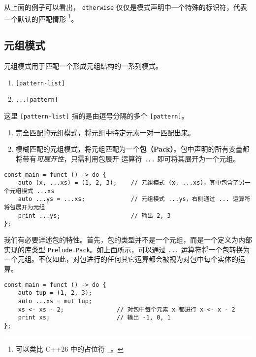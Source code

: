 从上面的例子可以看出， \lstinline!otherwise! 仅仅是模式声明中一个特殊的标识符，代表一个默认的匹配情形 \footnote{可以类比 C++26 中的占位符 \texttt{\_}。}。


\subsection{元组模式}

元组模式用于匹配一个形成元组结构的一系列模式。

\begin{grammar} \label{grm:tuple-pattern}
\begin{enumerate}
    \item \lstinline![pattern-list]!
    \item \lstinline!...[pattern]!
\end{enumerate}
\end{grammar}

这里 \lstinline![pattern-list]! 指的是由逗号分隔的多个 \lstinline![pattern]!。

\begin{enumerate}
    \item 完全匹配的元组模式，将元组中特定元素一对一匹配出来。
    \item 模糊匹配的元组模式，将元组匹配为一个\textbf{包（Pack）}。包中声明的所有变量都将带有\emph{可展开性}，只需利用包展开 运算符 \lstinline!...! 即可将其展开为一个元组。
\end{enumerate}

\begin{lstlisting}
const main = funct () -> do {
    auto (x, ...xs) = (1, 2, 3);    // 元组模式 (x, ...xs)，其中包含了另一个元组模式 ...xs
    auto ...ys = ...xs;             // 元组模式 ...ys，右侧通过 ... 运算符将包展开为元组
    print ...ys;                    // 输出 2, 3
};
\end{lstlisting}

我们有必要详述包的特性。首先，包的类型并不是一个元组，而是一个定义为内部实现的库类型 \lstinline!Prelude.Pack!。如上面所示，可以通过 \lstinline!...! 运算符将一个包转换为一个元组。不仅如此，对包进行的任何其它运算都会被视为对包中每个实体的运算。

\begin{lstlisting}
const main = funct () -> do {
	auto tup = (1, 2, 3);
	auto ...xs = mut tup;
	xs <- xs - 2;				// 对包中每个元素 x 都进行 x <- x - 2
	print xs;					// 输出 -1, 0, 1
};
\end{lstlisting}

